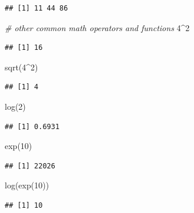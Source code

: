 \documentclass[
  12pt,
]{style/krantz}
\newenvironment{Shaded}{\begin{snugshade}}{\end{snugshade}}
\newcommand{\CommentTok}[1]{\textcolor[rgb]{0.56,0.35,0.01}{\textit{#1}}}
\newcommand{\DecValTok}[1]{\textcolor[rgb]{0.00,0.00,0.81}{#1}}
\newcommand{\FunctionTok}[1]{\textcolor[rgb]{0.00,0.00,0.00}{#1}}
\newcommand{\NormalTok}[1]{#1}
\newcommand{\SpecialCharTok}[1]{\textcolor[rgb]{0.00,0.00,0.00}{#1}}
\begin{document}
\begin{verbatim}
## [1] 11 44 86
\end{verbatim}

\begin{Shaded}
\begin{Highlighting}[]
\CommentTok{\# other common math operators and functions}
\DecValTok{4}\SpecialCharTok{\^{}}\DecValTok{2}
\end{Highlighting}
\end{Shaded}

\begin{verbatim}
## [1] 16
\end{verbatim}

\begin{Shaded}
\begin{Highlighting}[]
\FunctionTok{sqrt}\NormalTok{(}\DecValTok{4}\SpecialCharTok{\^{}}\DecValTok{2}\NormalTok{)}
\end{Highlighting}
\end{Shaded}

\begin{verbatim}
## [1] 4
\end{verbatim}

\begin{Shaded}
\begin{Highlighting}[]
\FunctionTok{log}\NormalTok{(}\DecValTok{2}\NormalTok{)}
\end{Highlighting}
\end{Shaded}

\begin{verbatim}
## [1] 0.6931
\end{verbatim}

\begin{Shaded}
\begin{Highlighting}[]
\FunctionTok{exp}\NormalTok{(}\DecValTok{10}\NormalTok{)}
\end{Highlighting}
\end{Shaded}

\begin{verbatim}
## [1] 22026
\end{verbatim}

\begin{Shaded}
\begin{Highlighting}[]
\FunctionTok{log}\NormalTok{(}\FunctionTok{exp}\NormalTok{(}\DecValTok{10}\NormalTok{))}
\end{Highlighting}
\end{Shaded}

\begin{verbatim}
## [1] 10
\end{verbatim}
\end{document}

